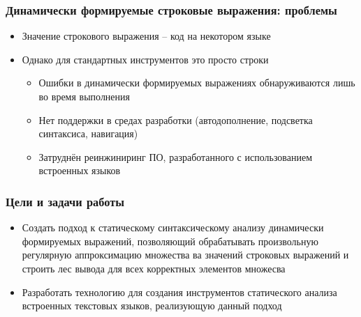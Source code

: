 \documentclass{beamer}
\begin{document}
\begin{frame}
    \transwipe[direction=90]
    \frametitle{Динамически формируемые строковые выражения: проблемы}
    \begin{itemize}
        \item Значение строкового выражения -- код на некотором языке
        \item Однако для стандартных инструментов это просто строки
        \begin{itemize}
            \item Ошибки в динамически формируемых выражениях обнаруживаются лишь во время выполнения
            \item Нет поддержки в средах разработки (автодополнение, подсветка синтаксиса, навигация)
            \item Затруднён реинжиниринг ПО, разработанного с использованием встроенных языков                
        \end{itemize}
    \end{itemize}
\end{frame}

\begin{frame}
    \transwipe[direction=90]
    \frametitle{Цели и задачи работы}
    \begin{itemize}
        \item Создать подход к статическому синтаксическому анализу динамически формируемых 
        выражений, позволяющий обрабатывать произвольную регулярную аппроксимацию множества ва 
        значений строковых выражений и строить лес вывода для всех корректных элементов множесва
        \item Разработать технологию для создания инструментов статического анализа встроенных 
        текстовых языков, реализующую данный подход
    \end{itemize}
\end{frame}
\end{document}
